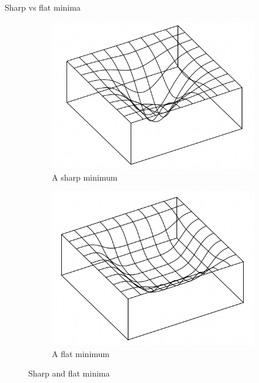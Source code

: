 \documentclass{beamer}
\begin{document}
\begin{frame}{Sharp vs flat minima}
    \begin{figure}
        \centering
        \begin{subfigure}[b]{0.4\textwidth}
            \centering
            \includegraphics[width=\textwidth]{sharp_minimum}
            \caption{A sharp minimum}
            \label{fig:sharp_minimum}
        \end{subfigure}
        \begin{subfigure}[b]{0.4\textwidth}
            \centering
            \includegraphics[width=\textwidth]{flat_minimum}
            \caption{A flat minimum}
            \label{fig:flat_minimum}
        \end{subfigure}
        \caption{Sharp and flat minima}
        \label{fig:sharp_and_flat_minima}
    \end{figure}
\end{frame}
\end{document}

